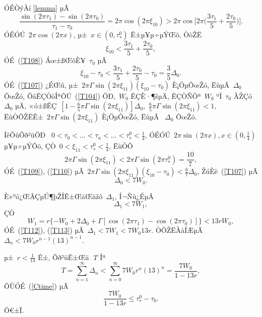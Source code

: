 \documentclass[12pt,openany,CJK,oneside]{cctbook}
\begin{document}
{ÓÉÒýÀí \;\ref{lemma} µÃ
\begin{equation}
  \frac{\sin(2\pi\tau_1)-\sin(2\pi\tau_0)}{\tau_1-\tau_0}=2\pi\cos(2\pi\xi_{10})>2\pi\cos \Big [2\pi \Big(\frac{3\tau_1}{5}+\frac{2\tau_0}{5}\Big)\Big].
\end{equation}
 ÓÉÓÚ\ $2\pi\cos(2\pi x)$, µ±\ $x\in(0,\tau^0_*)$ Ê±µ¥µ÷µÝŒõ, ÒòŽË
 \begin{equation}\label{T108}
   \xi_{10}<\frac{3\tau_1}{5}+\frac{2\tau_0}{5},
 \end{equation}
 ÓÉ\ (\ref{T108}) Áœ±ßŒõÈ¥\ $\tau_0$ µÃ
 \begin{equation}\label{T109}
  \xi_{10}-\tau_0<\frac{3\tau_1}{5}+\frac{2\tau_0}{5}-\tau_0=\frac{3}{5}\Delta_0.
\end{equation}
 ÓÉ\ (\ref{T107}) ¿ÉŒû, µ±\ $2\pi\Gamma\sin(2\pi\xi_{11})(\xi_{10}-\tau_0)$ È¡ÖµÔœŽó, ËùµÃ\ $\Delta_0$ ÔœŽó, ÕâÊÇÒòÎªÔÚ\ (\ref{T104}) ÖÐ,\ $W_0$ ÊÇÈ·¶šµÄ, ÊÇÒÑÖª\ $W_0$ ºÍ\ $\tau_0$ ÀŽÇó\ $\Delta_0$ µÄ, ×ó±ßÊÇ\ $[1-\frac{6}{5}\pi\Gamma\sin(2\pi\xi_{11})]\Delta_0$,\ $\frac{6}{5}\pi\Gamma\sin(2\pi\xi_{11})<1$,
ËùÒÔŽËÊ±\ $2\pi\Gamma\sin(2\pi\xi_{11})$ È¡ÖµÔœŽó, ËùµÃ \ $\Delta_0$ ÔœŽó.

ÍêÕûÕð²üÖÐ \ $0<\tau_0<\dots<\tau_n<\dots<\tau^0_*<\frac{1}{4}$, ÓÉÓÚ\ $2\pi\sin(2\pi x),x\in(0,\frac{1}{4})$ µ¥µ÷µÝÔö, ÇÒ\ $0<\xi_{11}<\tau^{0}_{*}<\frac{1}{4}$, ËùÒÔ
\begin{equation}\label{T110}
  2\pi\Gamma\sin(2\pi\xi_{11})<2\pi\Gamma\sin(2\pi\tau^0_*)=\frac{10}{7},
\end{equation}
ÓÉ\ (\ref{T109}), (\ref{T110}) µÃ\ $2\pi\Gamma\sin(2\pi\xi_{11})(\xi_{10}-\tau_0)<\frac{6}{7}\Delta_0$,  ŽúÈë\ (\ref{T107}) µÃ
\begin{equation}\label{T111}
  \Delta_0<7W_0.
\end{equation}

È»ºó¿ŒÂÇµÚ¶þŽÎÊ±ŒäŒäžô\ $\Delta_1$, Í¬Ñù¿ÉµÃ
\begin{equation}\label{T112}
  \Delta_1<7W_1,
\end{equation}
 ÇÒ
 \begin{equation}\label{T113}
  W_1= r\{-W_0+2\Delta_0+\Gamma[\cos(2\pi\tau_1)-\cos(2\pi\tau_0)]\} < 13r W_0,
\end{equation}
ÓÉ\ (\ref{T112}), (\ref{T113}) µÃ\ $\Delta_1<7W_1<7W_0 13r$. ÒÔŽËÀàÍÆµÃ\ $\Delta_n<7W_0r^{n-1}(13)^{n-1}$.

µ±\ $r<\frac{1}{13}$ Ê±, Õð²üÊ±Œä\ \emph{T} Îª
 \begin{equation}\label{T114}
 T=\sum_{n=1}^{\infty}\Delta_n<\sum_{n=0}^\infty7W_0r^{n}(13)^{n}=\frac{7W_0}{1-13r},
\end{equation}
ÔÙÓÉ\ (\ref{Ctime}) µÃ
\begin{equation}\label{T115}
   \frac{7W_0}{1-13r}\leq\tau^0_*-\tau_0.
   \end{equation}
Ö€±Ï.

}
\end{document}
